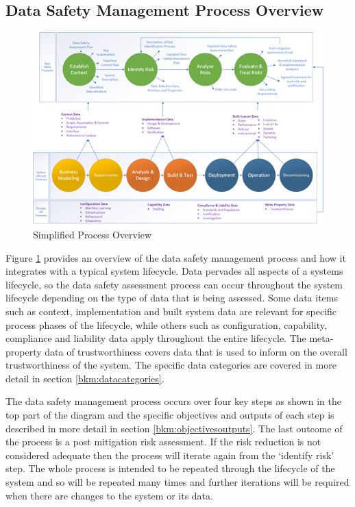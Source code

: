 \subsection{Data Safety Management Process Overview}
\begin{figure}[hb]
\centering
\includegraphics[angle=90]{images/Lifecycle}
\caption{Simplified Process Overview}
\label{fig:process}
\end{figure}
Figure \ref{fig:process} provides an overview of the data safety management process and how it integrates with a typical system lifecycle. Data pervades all aspects of a systems lifecycle, so the data safety assessment process can occur throughout the system lifecycle depending on the type of data that is being assessed. Some data items such as context, implementation and built system data are relevant for specific process phases of the lifecycle, while others such as configuration, capability, compliance and liability data apply throughout the entire lifecycle. The meta-property data of trustworthiness covers data that is used to inform on the overall trustworthiness of the system. The specific data categories are covered in more detail in section \ref{bkm:datacategories}.

The data safety management process occurs over four key steps as shown in the top part of the diagram and the specific objectives and outputs of each step is described in more detail in section \ref{bkm:objectivesoutputs}. The last outcome of the process is a post mitigation risk assessment. If the risk reduction is not considered adequate then the process will iterate again from the `identify risk' step. The whole process is intended to be repeated through the lifecycle of the system and so will be repeated many times and further iterations will be required when there are changes to the system or its data.

